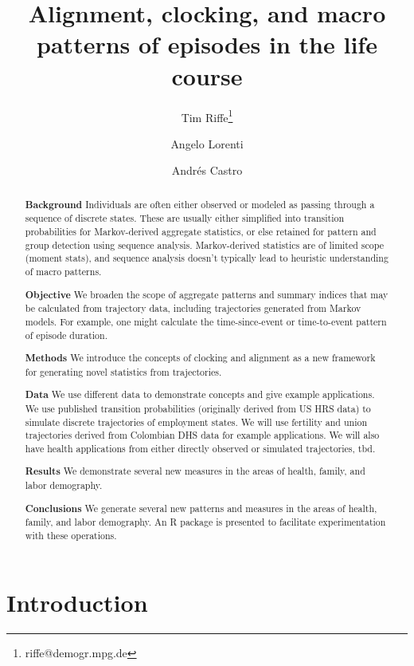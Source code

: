 \documentclass{article}
\newcommand{\absdiv}[1]{%
  \par\addvspace{.5\baselineskip}%
  \noindent\textbf{#1}\quad\ignorespaces
}
\begin{document}
\title{Alignment, clocking, and macro patterns of episodes in the life course}
\author[1]{Tim Riffe\thanks{riffe@demogr.mpg.de}}
\author[1]{Angelo Lorenti}
\author[1]{Andr\'{e}s Castro}
\maketitle

\begin{abstract}

\absdiv{Background}Individuals are often either observed or modeled as passing through a sequence of discrete states. These are usually either simplified into transition probabilities for Markov-derived aggregate statistics, or else retained for pattern and group detection using sequence analysis. Markov-derived statistics are of limited scope (moment stats), and sequence analysis doesn't typically lead to heuristic understanding of macro patterns.
\absdiv{Objective}We broaden the scope of aggregate patterns and summary indices that may be calculated from trajectory data, including trajectories generated from Markov models. For example, one might calculate the time-since-event or time-to-event pattern of episode duration.
\absdiv{Methods}We introduce the concepts of clocking and alignment as a new framework for generating novel statistics from trajectories. 
\absdiv{Data}We use different data to demonstrate concepts and give example applications. We use published transition probabilities (originally derived from US HRS data) to simulate discrete trajectories of employment states. We will use fertility and union trajectories derived from Colombian DHS data for example applications. We will also have health applications from either directly observed or simulated trajectories, tbd.
\absdiv{Results}We demonstrate several new measures in the areas of health, family, and labor demography.
\absdiv{Conclusions}We generate several new patterns and measures in the areas of health, family, and labor demography. An R package is presented to facilitate experimentation with these operations.
\end{abstract}

\section{Introduction}

% 
% 
% 
% 
\end{document}
